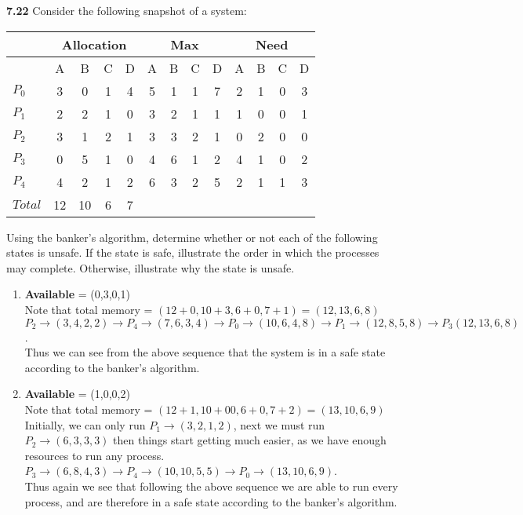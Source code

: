 \documentclass[12pt]{jhwhw}
\begin{document}
\clearpage
\textbf{7.22}  
	Consider the following snapshot of a system: \bigbreak
	\begin{tabular}{|l||c|c|c|c||c|c|c|c||c|c|c|c|}
		\hline
		& \multicolumn{4}{|c||}{Allocation} & \multicolumn{4}{|c||}{Max} & \multicolumn{4}{|c|}{Need} \\ \hline
		& A & B & C & D & A & B & C & D & A & B & C & D\\ \hline
		$P_0$ & 3 & 0 & 1 & 4 & 5 & 1 & 1 & 7 & 2 & 1 & 0 & 3 \\ \hline
		$P_1$ & 2 & 2 & 1 & 0 & 3 & 2 & 1 & 1 & 1 & 0 & 0 & 1 \\ \hline
		$P_2$ & 3 & 1 & 2 & 1 & 3 & 3 & 2 & 1 & 0 & 2 & 0 & 0 \\ \hline
		$P_3$ & 0 & 5 & 1 & 0 & 4 & 6 & 1 & 2 & 4 & 1 & 0 & 2 \\ \hline
		$P_4$ & 4 & 2 & 1 & 2 & 6 & 3 & 2 & 5 & 2 & 1 & 1 & 3 \\ \hline\hline
		$Total$ & 12 & 10 & 6 & 7 & & & & & & & & \\ \hline
	\end{tabular}

	\bigbreak
	Using the banker's algorithm, determine whether or not each of the following states is unsafe.
	If the state is safe, illustrate the order in which the processes may complete. Otherwise, illustrate why 
	the state is unsafe. \\
	\begin{enumerate}
		\item \textbf{Available} = (0,3,0,1) \\
			Note that total memory = $(12+0, 10+3, 6+0, 7+1) = (12, 13, 6, 8)$ \\
			$P_2 \rightarrow (3,4,2,2) \rightarrow P_4 \rightarrow (7, 6, 3, 4)
			\rightarrow P_0 \rightarrow (10, 6, 4, 8) \rightarrow P_1 \rightarrow (12, 8, 5, 8)
			\rightarrow P_3 (12, 13, 6, 8)
			$. \\
			Thus we can see from the above sequence that the system is in a safe state according
			to the banker's algorithm.
		\item \textbf{Available} = (1,0,0,2) \\
			Note that total memory = $(12+1, 10+00, 6+0, 7+2) = (13, 10, 6, 9)$ \\
			Initially, we can only run $P_1 \rightarrow (3, 2, 1, 2)$, next we must
			run $P_2 \rightarrow (6, 3, 3, 3)$ then things start getting much easier,
			as we have enough resources to run any process. $P_3 \rightarrow (6, 8, 4, 3)
			\rightarrow P_4 \rightarrow (10, 10, 5, 5) \rightarrow P_0 \rightarrow (13, 10, 6, 9)$. \\
			Thus again we see that following the above sequence we are able to run every process, and are
			therefore in a safe state according to the banker's algorithm.
	\end{enumerate}
\bigbreak
\end{document}
